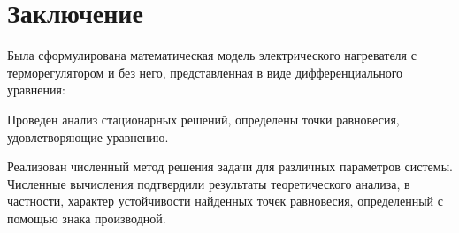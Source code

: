 \chapter{Заключение}
Была сформулирована математическая модель электрического нагревателя с терморегулятором и без него, представленная в виде дифференциального уравнения:

Проведен анализ стационарных решений, определены точки равновесия, удовлетворяющие уравнению.

Реализован численный метод решения задачи для различных параметров системы. Численные вычисления подтвердили результаты теоретического анализа, в частности, характер устойчивости найденных точек равновесия, определенный с помощью знака производной.